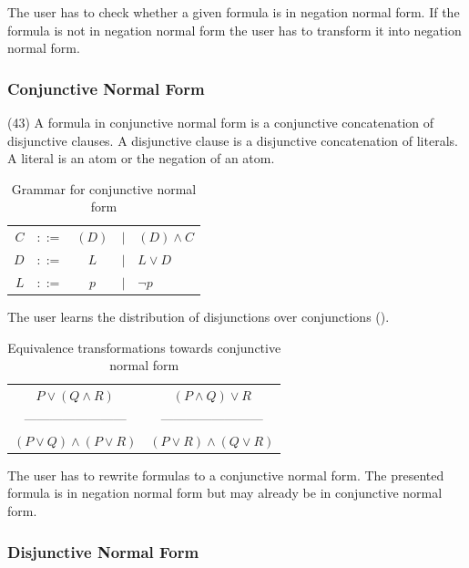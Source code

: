 The user has to check whether a given formula is in negation normal form.
If the formula is not in negation normal form
the user has to transform it into negation normal form.

\subsubsection{Conjunctive Normal Form}
\label{tut:43}

(43) A formula in conjunctive normal form is a conjunctive concatenation of disjunctive clauses.
A disjunctive clause is a disjunctive concatenation of literals. 
A literal is an atom or the negation of an atom. 

\begin{table}[htdp]
\begin{center}
\begin{tabular}{rcccl}
$C$	&$::=$ & $(D)$ 	&$|$ & $(D) \wedge C$\\
$D$	&$::=$ & $L$ 	&$|$ & $L \vee D$\\
$L$	&$::=$ & $p$ 	&$|$ & $\neg p$ 
\end{tabular}
\caption{Grammar for conjunctive normal form}
\label{tab:CNF}
\end{center}
\end{table}

The user learns the distribution of disjunctions over conjunctions ().

\begin{table}[htdp]
\begin{center}
\begin{tabular}{cc}
$P \vee (Q \wedge R)$ & $(P \wedge Q) \vee R$\\
———————— & ————————\\
$(P\vee Q) \wedge (P\vee R)$ & $(P\vee R) \wedge (Q\vee R)$
\end{tabular}
\caption{Equivalence transformations towards conjunctive normal form}
\label{tab:ET_CNF}
\end{center}
\end{table}

The user has to rewrite formulas to a conjunctive normal form.  
The presented formula is in negation normal form 
but may already be in conjunctive normal form.


\subsubsection{Disjunctive Normal Form}
\label{tut:44}

